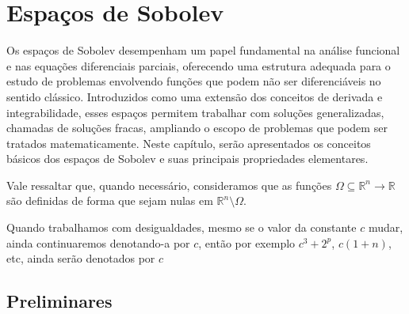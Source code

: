 \documentclass[a4paper, 11pt]{book}
\theoremstyle{definition}
\newcommand{\bN}{\mathbb{N}}
\newcommand{\bR}{\mathbb{R}}
\newcommand{\bK}{\mathbb{K}}
\newcommand{\cC}{\mathcal{C}}
\begin{document}




\chapter{Espaços de Sobolev} \label{ch:sobolev}

Os espaços de Sobolev desempenham um papel fundamental na análise funcional e nas equações diferenciais parciais, oferecendo uma estrutura adequada para o estudo de problemas envolvendo funções que podem não ser diferenciáveis no sentido clássico. Introduzidos como uma extensão dos conceitos de derivada e integrabilidade, esses espaços permitem trabalhar com soluções generalizadas, chamadas de soluções fracas, ampliando o escopo de problemas que podem ser tratados matematicamente. Neste capítulo, serão apresentados os conceitos básicos dos espaços de Sobolev e suas principais propriedades elementares.

Vale ressaltar que, quando necessário, consideramos que as funções $\Omega \subseteq \bR^n \to \bR$ são definidas de forma que sejam nulas em $\bR^n \setminus \Omega$. 

Quando trabalhamos com desigualdades, mesmo se o valor da constante $c$ mudar, ainda continuaremos denotando-a por $c$, então por exemplo $c^3 + 2^p$, $c(1 + n)$, etc, ainda serão denotados por $c$

\section{Preliminares}
\end{document}
